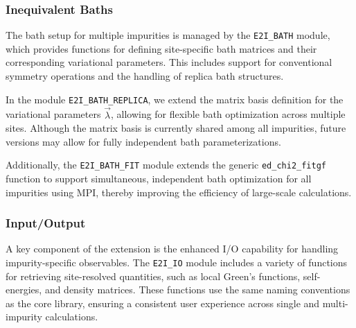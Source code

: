 \documentclass[edipack_sp.tex]{subfiles}
\begin{document}
  


\subsubsection{Inequivalent Baths}\label{ssSecIneqBath}
The bath setup for multiple impurities is managed by the 
{\tt E2I\_BATH} module, which provides functions for defining 
site-specific bath matrices and their corresponding variational 
parameters. This includes support for conventional symmetry operations 
and the handling of replica bath structures. 

In the module {\tt E2I\_BATH\_REPLICA}, we extend the 
matrix basis definition for the variational parameters 
$\vec{\lambda}$, allowing for flexible bath optimization across 
multiple sites. Although the matrix basis is currently shared among 
all impurities, future versions may allow for fully independent 
bath parameterizations.

Additionally, the {\tt E2I\_BATH\_FIT} module extends the generic 
{\tt ed\_chi2\_fitgf} function to support simultaneous, independent 
bath optimization for all impurities using MPI, thereby improving the 
efficiency of large-scale calculations.


 
\subsubsection{Input/Output}\label{ssSecIneqIO}
A key component of the  extension is the 
enhanced I/O capability for handling impurity-specific observables. 
The {\tt E2I\_IO} module includes a variety of functions for 
retrieving site-resolved quantities, such as local Green's functions, 
self-energies, and density matrices. These functions use the same 
naming conventions as the core \NAME library, ensuring a consistent 
user experience across single and multi-impurity calculations.


\ifSubfilesClassLoaded{
  
}{}
\end{document}
